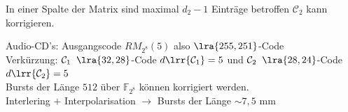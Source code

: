 	In einer Spalte der Matrix sind maximal $d_2-1$ Einträge betroffen $\mathcal{C}_2$ kann korrigieren.
	
	Audio-CD's: Ausgangscode $RM_{2^8}(5)$ also $\lra{255,251}$-Code\\
	Verkürzung: $\mathcal{C}_1\;\;\lra{32,28}$-Code $d\lrr{\mathcal{C}_1}=5$ und $\mathcal{C}_2\;\;\lra{28,24}$-Code $d\lrr{\mathcal{C}_2}=5$\\
	Bursts der Länge $512$ über $\mathbb{F}_{2^8}$ können korrigiert werden.\\
	Interlering $+$ Interpolarisation $\rightarrow$ Bursts der Länge $\sim 7,5\mbox{ mm}$